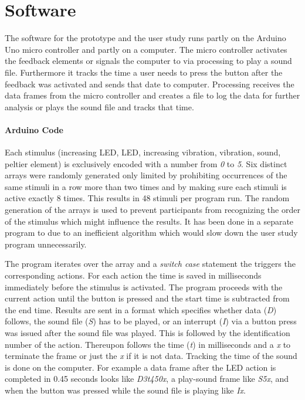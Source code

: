 \section{Software}

The  software for the prototype and the user study runs partly on the Arduino Uno micro controller and partly on a computer.
The micro controller activates the feedback elements or signals the computer to via processing to play a sound file. 
Furthermore it tracks the time a user needs to press the button after the feedback was activated and sends that date to computer.
Processing receives the data frames from the micro controller and creates a file to log the data for further analysis or plays the sound file and tracks that time.

\paragraph{Arduino Code}
Each stimulus (increasing LED, LED, increasing vibration, vibration, sound, peltier element) is exclusively encoded with a number from \emph{0} to \emph{5}.
Six distinct arrays were randomly generated only limited by prohibiting occurrences of the same stimuli in a row more than two times and by making sure each stimuli is active exactly 8 times.
This results in 48 stimuli per program run.
The random generation of the arrays is used to prevent participants from recognizing the order of the stimulus which might influence the results.
It has been done in a  separate program to due to an inefficient algorithm which would slow down the user study program unnecessarily.

The program iterates over the array and a \emph{switch case} statement the triggers the corresponding actions.
For each action the time is saved in milliseconds immediately before the stimulus is activated.
The program proceeds with the current action until the button is pressed and the start time is subtracted from the end time.
Results are sent in a format which specifies whether data (\emph{D}) follows, the sound file (\emph{S}) has to be played, or an interrupt (\emph{I}) via a button press was issued after the sound file was played. 
This is followed by the identification number of the action.
Thereupon follows the time (\emph{t}) in milliseconds and a \emph{x} to terminate the frame or just the \emph{x} if it is not data.
Tracking the time of the sound is done on the computer.
For example a data frame after the LED action is completed in 0.45 seconds looks like \emph{D3t450x}, a play-sound frame like \emph{S5x}, and when the button was pressed while the sound file is playing like \emph{Ix}.

